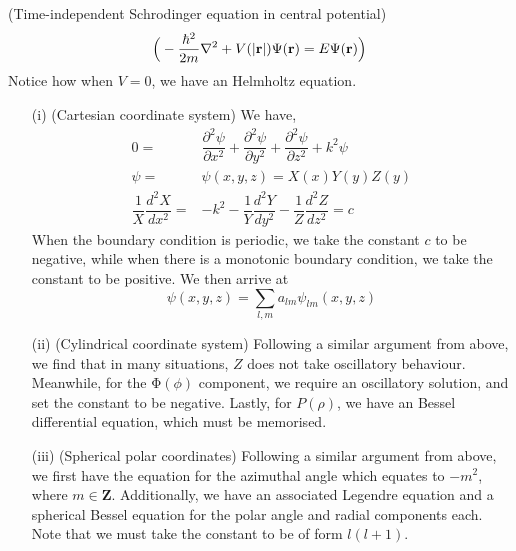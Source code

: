 \begin{thm}
(Time-independent Schrodinger equation in central potential) 
\[\Big(-\dfrac{\hbar ^2}{2m}\nabla^2+V(|{\bf r}|)\mathrm{\Psi} ({\bf r})=E\mathrm{\Psi} ({\bf r})\Big)\]
Notice how when $V=0$, we have an Helmholtz equation.
\begin{itemize}
\item[(i)] (Cartesian coordinate system) We have,
\begin{align*}
0=&\dfrac{\partial ^2\psi }{\partial x^2}+\dfrac{\partial ^2\psi }{\partial y^2}+\dfrac{\partial ^2 \psi}{\partial z^2}+k^2\psi	 \\
\psi =&\psi (x,y,z)=X(x)Y(y)Z(y)\\
\dfrac{1}{X}\dfrac{d ^2X}{d x^2}=&-k^2-\dfrac{1}{Y}\dfrac{d ^2Y}{d y^2}-\dfrac{1}{Z}\dfrac{d ^2Z}{dz^2 }=c   
\end{align*}
When the boundary condition is periodic, we take the constant $c$ to be negative, while when there is a monotonic boundary condition, we take the constant to be positive. We then arrive at
\[\psi (x,y,z)=\sum _{l,m}a_{lm}\psi _{lm}(x,y,z)\]
\item[(ii)] (Cylindrical coordinate system) Following a similar argument from above, we find that in many situations, $Z$ does not take oscillatory behaviour. Meanwhile, for the $\mathrm{\Phi}  (\phi ) $ component, we require an oscillatory solution, and set the constant to be negative. Lastly, for $P(\rho )$, we have an Bessel differential equation, which must be memorised.
\item[(iii)] (Spherical polar coordinates) Following a similar argument from above, we first have the equation for the azimuthal angle which equates to $-m^2$, where $m\in {\bm Z}$. Additionally, we have an associated Legendre equation and a spherical Bessel equation for the polar angle and radial components each. Note that we must take the constant to be of form $l(l+1)$. 
\end{itemize}
\end{thm}
\vspace{2ex}

